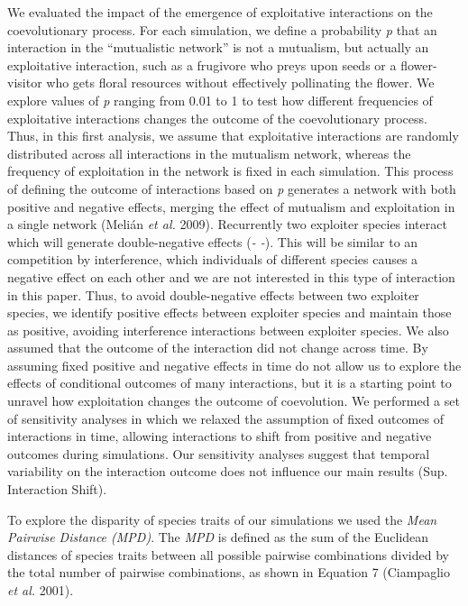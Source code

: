 \documentclass[a4paper, 12pt]{article}
\begin{document}
We evaluated the impact of the emergence of exploitative interactions on the coevolutionary process. For each simulation, we define a probability \textit{p} that an interaction in the “mutualistic network” is not a mutualism, but actually an exploitative interaction, such as a frugivore who preys upon seeds or a flower-visitor who gets floral resources without effectively pollinating the flower. We explore values of \textit{p} ranging from 0.01 to 1 to test how different frequencies of exploitative interactions changes the outcome of the coevolutionary process. Thus, in this first analysis, we assume that exploitative interactions are randomly distributed across all interactions in the mutualism network, whereas the frequency of exploitation  in the network is fixed in each simulation. This process of defining the outcome of  interactions based on \textit{p} generates a network with both positive and negative effects, merging the effect of mutualism and exploitation in a single network (Melián \textit{et al.} 2009). Recurrently two exploiter species interact which will generate double-negative effects (\textit{- -}). This will be similar to an competition by interference, which individuals of different species causes a negative effect on each other and we are not interested in this type of interaction in this paper. Thus, to avoid double-negative effects between two exploiter species, we identify positive effects between exploiter species and maintain those as positive, avoiding interference interactions between exploiter species. We also assumed that the outcome of the interaction did not change across time. By assuming fixed positive and negative effects in time do not allow us to explore the effects of conditional outcomes of many interactions, but it is a starting point to unravel how exploitation changes the outcome of coevolution. We performed a set of sensitivity analyses in which we relaxed the assumption of fixed outcomes of interactions in time, allowing interactions to shift from positive and negative outcomes during simulations. Our sensitivity analyses suggest that temporal variability on the interaction outcome does not influence our main results (Sup. Interaction Shift).

To explore the disparity of species traits of our simulations we used the \textit{Mean Pairwise Distance (MPD)}. The \textit{MPD} is defined as the sum of the Euclidean distances of species traits between all possible pairwise combinations divided by the total number of pairwise combinations, as shown in Equation 7 (Ciampaglio \textit{et al.} 2001).
\end{document}
